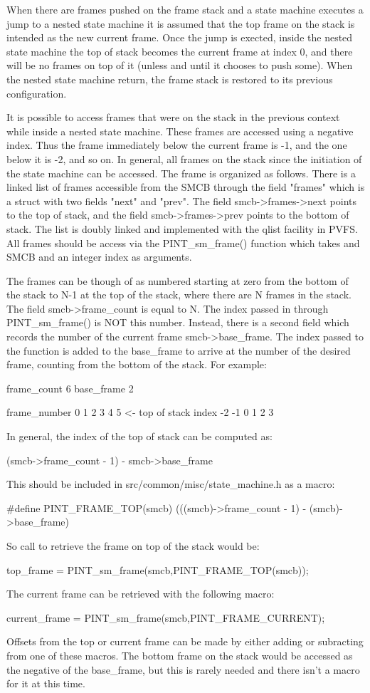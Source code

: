 When there are frames pushed on the frame stack and a state machine executes a
jump to a nested state machine it is assumed that the top frame on the stack
is intended as the new current frame.  Once the jump is exected, inside the
nested state machine the top of stack becomes the current frame at index 0, and
there will be no frames on top of it (unless and until it chooses to push some).
When the nested state machine return, the frame stack is restored to its
previous configuration.

It is possible to access frames that were on the stack in the previous context
while inside a nested state machine.  These frames are accessed using a negative
index.  Thus the frame immediately below the current frame is -1, and the one
below it is -2, and so on.  In general, all frames on the stack since the
initiation of the state machine can be accessed.  The frame is organized as
follows.  There is a linked list of frames accessible from the SMCB through the
field "frames" which is a struct with two fields "next" and "prev".  The field
smcb->frames->next points to the top of stack, and the field smcb->frames->prev
points to the bottom of stack.  The list is doubly linked and implemented with
the qlist facility in PVFS.  All frames should be access via the PINT\_sm\_frame()
function which takes and SMCB and an integer index as arguments.

The frames can be though of as numbered starting at zero from the bottom of the
stack to N-1 at the top of the stack, where there are N frames in the stack. 
The field smcb->frame\_count is equal to N.  The index passed in through
PINT\_sm\_frame() is NOT this number.  Instead, there is a second field which
records the number of the current frame smcb->base\_frame.  The index passed to
the function is added to the base\_frame to arrive at the number of the desired
frame, counting from the bottom of the stack.  For example:

frame\_count 6
base\_frame 2

frame\_number     0  1  2  3  4  5  <- top of stack
index           -2 -1  0  1  2  3

In general, the index of the top of stack can be computed as:

(smcb->frame\_count - 1) - smcb->base\_frame

This should be included in src/common/misc/state\_machine.h as a macro:

#define PINT\_FRAME\_TOP(smcb) (((smcb)->frame\_count - 1) - (smcb)->base\_frame)

So call to retrieve the frame on top of the stack would be:

top\_frame = PINT\_sm\_frame(smcb,PINT\_FRAME\_TOP(smcb));

The current frame can be retrieved with the following macro:

current\_frame = PINT\_sm\_frame(smcb,PINT\_FRAME\_CURRENT);

Offsets from the top or current frame can be made by either adding or subracting
from one of these macros.  The bottom frame on the stack would be accessed as
the negative of the base\_frame, but this is rarely needed and there isn't a
macro for it at this time.
